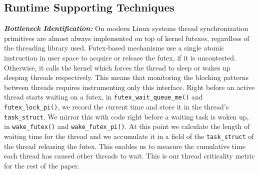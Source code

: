\subsection{Runtime Supporting Techniques}
\textbf{\textit{Bottleneck Identification:}}
On modern Linux systems thread synchronization primitives are almost always implemented on top of kernel futexes, regardless of the threading library used. Futex-based mechanisms use a single atomic instruction in user space to acquire or release the futex, if it is uncontested. Otherwise, it calls the kernel which forces the thread to sleep or wakes up sleeping threads respectively.
This means that monitoring the blocking patterns between threads requires instrumenting only this interface. Right before an active thread starts waiting on a futex, in \texttt{futex\_wait\_queue\_me()} and \texttt{futex\_lock\_pi()}, we record the current time and store it in the thread's \texttt{task\_struct}. We mirror this with code right before a waiting task is woken up, in \texttt{wake\_futex()} and \texttt{wake\_futex\_pi()}. At this point we calculate the length of waiting time for the thread and we accumulate it in a field of the \texttt{task\_struct} of the thread releasing the futex. This enables us to measure the cumulative time each thread has caused other threads to wait. This is our thread criticality metric for the rest of the paper.

